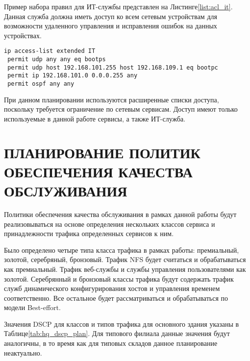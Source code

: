 \documentclass[14pt, a4paper]{extarticle}
\begin{document}
Пример набора правил для ИТ-службы представлен на
Листинге\;\ref{list:acl_it}. Данная служба должна иметь доступ ко всем
сетевым устройствам для возможности удаленного управления и
исправления ошибок на данных устройствах.
\begin{lstlisting}[caption=Команды списков контроля доступа для ИТ-службы\label{list:acl_it}]
ip access-list extended IT
 permit udp any any eq bootps
 permit udp host 192.168.101.255 host 192.168.109.1 eq bootpc
 permit ip 192.168.101.0 0.0.0.255 any
 permit ospf any any
\end{lstlisting}

При данном планировании используются расширенные списки доступа,
поскольку требуется ограничение по сетевым сервисам. Доступ имеют
только используемые в данной работе сервисы, а также ИТ-служба.

\section{ПЛАНИРОВАНИЕ ПОЛИТИК ОБЕСПЕЧЕНИЯ КАЧЕСТВА ОБСЛУЖИВАНИЯ}
Политики обеспечения качества обслуживания в рамках данной работы
будут реализовываться на основе определения нескольких классов сервиса
и принадлежности трафика определенных сервисов к ним.

Было определено четыре типа класса трафика в рамках работы:
премиальный, золотой, серебряный, бронзовый. Трафик NFS будет
считаться и обрабатываться как премиальный. Трафик веб-службы и службы
управления пользователями как золотой. Серебрянный и бронзовый классы
трафика будут содержать трафик служб динамического конфигурирования
хостов и управления временем соответственно. Все остальное будет
рассматриваться и обрабатываться по модели Best-effort.

Значения DSCP\cite{dscp-value} для классов и типов трафика для
основного здания указаны в Таблице\;\ref{tab:hq_dscp_plan}. Для
типового филиала данные значения будут аналогичны, в то время как для
типовых складов данное планирование неактуально.
\end{document}
